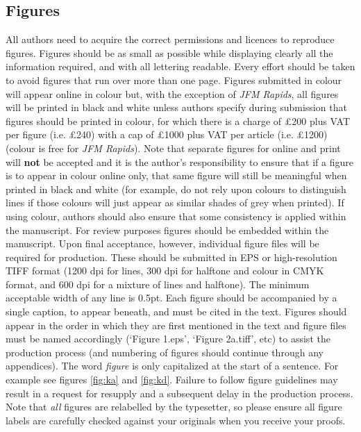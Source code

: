 \documentclass{jfm}
\begin{document}
\subsection{Figures}
All authors need to acquire the correct permissions and licences to reproduce figures. Figures should be as small as possible while displaying clearly all the information required, and with all lettering readable. Every effort should be taken to avoid figures that run over more than one page. Figures submitted in colour will appear online in colour but, with the exception of {\it JFM Rapids}, all figures will be printed in black and white unless authors specify during submission that figures should be printed in colour, for which there is a charge of \pounds200 plus VAT per figure (i.e. \pounds240) with a cap of \pounds1000 plus VAT per article (i.e. \pounds1200) (colour is free for {\it JFM Rapids}).  Note that separate figures for online and print will {\bf not} be accepted and it is the author's responsibility to ensure that if a figure is to appear in colour online only, that same figure will still be meaningful when printed in black and white (for example, do not rely upon colours to distinguish lines if those colours will just appear as similar shades of grey when printed). If using colour, authors should also ensure that some consistency is applied within the manuscript. For review purposes figures should be embedded within the manuscript. Upon final acceptance, however, individual figure files will be required for production. These should be submitted in EPS or high-resolution TIFF format (1200 dpi for lines, 300 dpi for halftone and colour in CMYK format, and 600 dpi for a mixture of lines and halftone). The minimum acceptable width of any line is 0.5pt. Each figure should be accompanied by a single caption, to appear beneath, and must be cited in the text. Figures should appear in the order in which they are first mentioned in the text and figure files must be named accordingly (`Figure 1.eps', `Figure 2a.tiff', etc) to assist the production process (and numbering of figures should continue through any appendices). The word \textit {figure} is only capitalized at the start of a sentence. For example see figures \ref{fig:ka} and \ref{fig:kd}. Failure to follow figure guidelines may result in a request for resupply and a subsequent delay in the production process. Note that {\em all} figures are relabelled by the typesetter, so please ensure all figure labels are carefully checked against your originals when you receive your proofs. 
\end{document}
